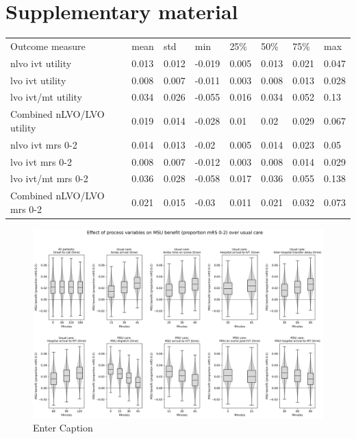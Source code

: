 \section{Supplementary material}





\begin{minipage}{1.0\linewidth}
\begin{tabular}{llllllll}
Outcome measure           & mean  & std   & min    & 25\%  & 50\%  & 75\%  & max   \\
nlvo ivt utility          & 0.013 & 0.012 & -0.019 & 0.005 & 0.013 & 0.021 & 0.047 \\
lvo ivt utility           & 0.008 & 0.007 & -0.011 & 0.003 & 0.008 & 0.013 & 0.028 \\
lvo ivt/mt utility        & 0.034 & 0.026 & -0.055 & 0.016 & 0.034 & 0.052 & 0.13  \\
Combined nLVO/LVO utility & 0.019 & 0.014 & -0.028 & 0.01  & 0.02  & 0.029 & 0.067 \\
nlvo ivt mrs 0-2          & 0.014 & 0.013 & -0.02  & 0.005 & 0.014 & 0.023 & 0.05  \\
lvo ivt mrs 0-2           & 0.008 & 0.007 & -0.012 & 0.003 & 0.008 & 0.014 & 0.029 \\
lvo ivt/mt mrs 0-2        & 0.036 & 0.028 & -0.058 & 0.017 & 0.036 & 0.055 & 0.138 \\
Combined nLVO/LVO mrs 0-2 & 0.021 & 0.015 & -0.03  & 0.011 & 0.021 & 0.032 & 0.073
\end{tabular}
\end{minipage}

\begin{figure}
    \centering
    \includegraphics[width=1\linewidth]{images/msu_net_mrs_0-2_benefit.png}
    \caption{Enter Caption}
    \label{fig:enter-label}
\end{figure}

